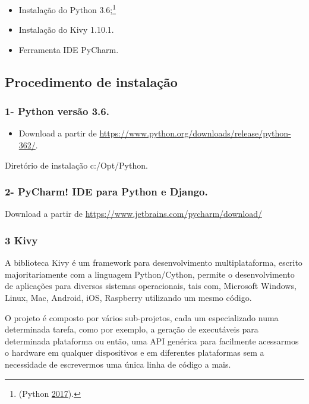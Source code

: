 \documentclass[12pt,]{article}
\providecommand{\tightlist}{%
  \setlength{\itemsep}{0pt}\setlength{\parskip}{0pt}}
\let\rmarkdownfootnote\footnote%
\def\footnote{\protect\rmarkdownfootnote}
\begin{document}
\begin{itemize}
\tightlist
\item
  Instalação do Python 3.6;\footnote{(Python
    \protect\hyperlink{ref-python362}{2017}).}
\item
  Instalação do Kivy 1.10.1.
\item
  Ferramenta IDE PyCharm.
\end{itemize}

\subsection{Procedimento de
instalação}\label{procedimento-de-instalacao}

\subsubsection{1- Python versão 3.6.}\label{python-versao-3.6.}

\begin{itemize}
\tightlist
\item
  Download a partir de
  \url{https://www.python.org/downloads/release/python-362/}.
\end{itemize}

Diretório de instalação c:/Opt/Python.

\subsubsection{2- PyCharm! IDE para Python e
Django.}\label{pycharm-ide-para-python-e-django.}

Download a partir de \url{https://www.jetbrains.com/pycharm/download/}

\subsubsection{3 Kivy}\label{kivy}

A biblioteca Kivy é um framework para desenvolvimento multiplataforma,
escrito majoritariamente com a linguagem Python/Cython, permite o
desenvolvimento de aplicações para diversos sistemas operacionais, tais
com, Microsoft Windows, Linux, Mac, Android, iOS, Raspberry utilizando
um mesmo código.

O projeto é composto por vários sub-projetos, cada um especializado numa
determinada tarefa, como por exemplo, a geração de executáveis para
determinada plataforma ou então, uma API genérica para facilmente
acessarmos o hardware em qualquer dispositivos e em diferentes
plataformas sem a necessidade de escrevermos uma única linha de código a
mais.
\end{document}
